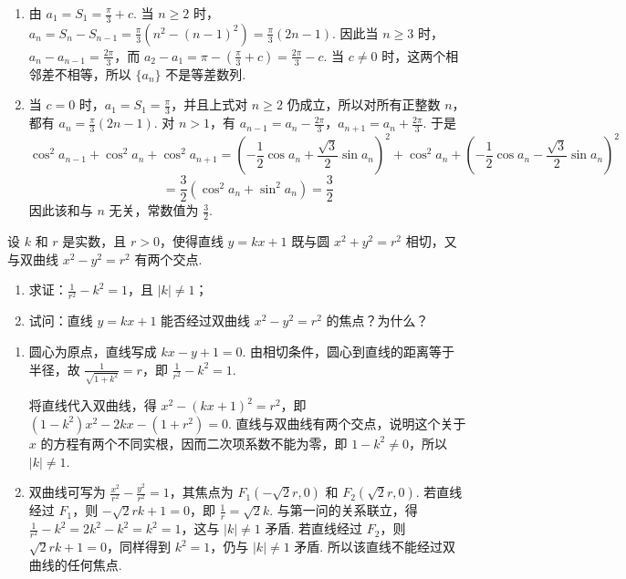 \documentclass[UTF8,a4paper,oneside,11pt]{ctexbook}
\begin{document}
\begin{solution}
\begin{enumerate}
\item 由 \(a_1=S_1=\frac\pi3+c\). 当 \(n\geqslant2\) 时，\(a_n=S_n-S_{n-1}=\frac\pi3\left(n^2-(n-1)^2\right)=\frac\pi3(2n-1)\). 因此当 \(n\geqslant3\) 时，\(a_n-a_{n-1}=\frac{2\pi}{3}\)，而 \(a_2-a_1=\pi-\left(\frac\pi3+c\right)=\frac{2\pi}{3}-c\). 当 \(c\neq0\) 时，这两个相邻差不相等，所以 \(\{a_n\}\) 不是等差数列.
\item 当 \(c=0\) 时，\(a_1=S_1=\frac\pi3\)，并且上式对 \(n\geqslant2\) 仍成立，所以对所有正整数 \(n\)，都有 \(a_n=\frac\pi3(2n-1)\). 对 \(n>1\)，有 \(a_{n-1}=a_n-\frac{2\pi}{3}\)，\(a_{n+1}=a_n+\frac{2\pi}{3}\). 于是
\[
\cos^2a_{n-1}+\cos^2a_n+\cos^2a_{n+1}
=\left(-\frac12\cos a_n+\frac{\sqrt3}{2}\sin a_n\right)^2+\cos^2a_n+\left(-\frac12\cos a_n-\frac{\sqrt3}{2}\sin a_n\right)^2
\]
\[
=\frac32\left(\cos^2a_n+\sin^2a_n\right)=\frac32
\]
因此该和与 \(n\) 无关，常数值为 \(\frac32\).
\end{enumerate}
\end{solution}

\begin{problem}
设 \(k\) 和 \(r\) 是实数，且 \(r > 0\)，使得直线 \(y = kx + 1\) 既与圆 \(x^2 + y^2 = r^2\) 相切，又与双曲线 \(x^2 - y^2 = r^2\) 有两个交点.
\begin{enumerate}
\item 求证：\(\frac{1}{r^2} - k^2 = 1\)，且 \(|k| \neq 1\)；
\item 试问：直线 \(y = kx + 1\) 能否经过双曲线 \(x^2 - y^2 = r^2\) 的焦点？为什么？
\end{enumerate}
\end{problem}

\begin{solution}
\begin{enumerate}
\item 圆心为原点，直线写成 \(kx-y+1=0\). 由相切条件，圆心到直线的距离等于半径，故 \(\frac1{\sqrt{1+k^2}}=r\)，即 \(\frac1{r^2}-k^2=1\).

将直线代入双曲线，得 \(x^2-(kx+1)^2=r^2\)，即 \((1-k^2)x^2-2kx-(1+r^2)=0\). 直线与双曲线有两个交点，说明这个关于 \(x\) 的方程有两个不同实根，因而二次项系数不能为零，即 \(1-k^2\neq0\)，所以 \(|k|\neq1\).
\item 双曲线可写为 \(\frac{x^2}{r^2}-\frac{y^2}{r^2}=1\)，其焦点为 \(F_1(-\sqrt2r,0)\) 和 \(F_2(\sqrt2r,0)\). 若直线经过 \(F_1\)，则 \(-\sqrt2rk+1=0\)，即 \(\frac1r=\sqrt2k\). 与第一问的关系联立，得 \(\frac1{r^2}-k^2=2k^2-k^2=k^2=1\)，这与 \(|k|\neq1\) 矛盾. 若直线经过 \(F_2\)，则 \(\sqrt2rk+1=0\)，同样得到 \(k^2=1\)，仍与 \(|k|\neq1\) 矛盾. 所以该直线不能经过双曲线的任何焦点.
\end{enumerate}
\end{solution}

\end{document}
